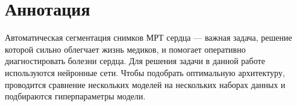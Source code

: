 \section{Аннотация}

Автоматическая сегментация снимков МРТ сердца — важная задача, решение которой сильно облегчает жизнь медиков, и помогает оперативно диагностировать болезни сердца. Для решения задачи в данной работе используются нейронные сети. Чтобы подобрать оптимальную архитектуру, проводится сравнение нескольких моделей на нескольких наборах данных и подбираются гиперпараметры модели.
